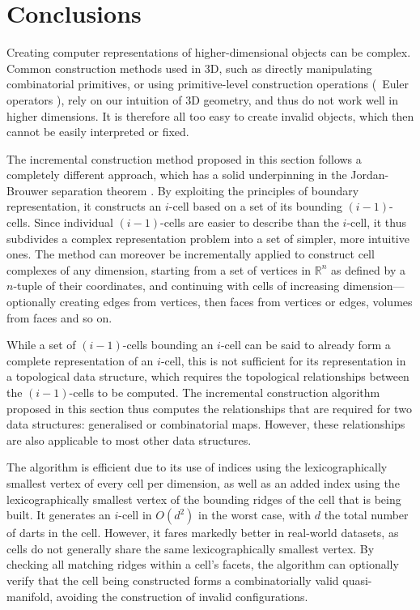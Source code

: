 \section{Conclusions}
\label{se:incremental-conclusions}

Creating computer representations of higher-dimensional objects can be complex.
Common construction methods used in 3D, such as directly manipulating combinatorial primitives, or using primitive-level construction operations (\eg\ Euler operators \citep{Mantyla88}), rely on our intuition of 3D geometry, and thus do not work well in higher dimensions.
It is therefore all too easy to create invalid objects, which then cannot be easily interpreted or fixed.

The incremental construction method proposed in this section follows a completely different approach, which has a solid underpinning in the Jordan-Brouwer separation theorem \citep{Lebesgue11,Brouwer11}.
By exploiting the principles of boundary representation, it constructs an $i$-cell based on a set of its bounding $(i-1)$-cells.
Since individual $(i-1)$-cells are easier to describe than the $i$-cell, it thus subdivides a complex representation problem into a set of simpler, more intuitive ones.
The method can moreover be incrementally applied to construct cell complexes of any dimension, starting from a set of vertices in $\mathbb{R}^n$ as defined by a $n$-tuple of their coordinates, and continuing with cells of increasing dimension---optionally creating edges from vertices, then faces from vertices or edges, volumes from faces and so on.

While a set of $(i-1)$-cells bounding an $i$-cell can be said to already form a complete representation of an $i$-cell, this is not sufficient for its representation in a topological data structure, which requires the topological relationships between the $(i-1)$-cells to be computed.
The incremental construction algorithm proposed in this section thus computes the relationships that are required for two data structures: generalised or combinatorial maps.
However, these relationships are also applicable to most other data structures.

The algorithm is efficient due to its use of indices using the lexicographically smallest vertex of every cell per dimension, as well as an added index using the lexicographically smallest vertex of the bounding ridges of the cell that is being built.
It generates an $i$-cell in $O(d^{2})$ in the worst case, with $d$ the total number of darts in the cell.
However, it fares markedly better in real-world datasets, as cells do not generally share the same lexicographically smallest vertex.
By checking all matching ridges within a cell's facets, the algorithm can optionally verify that the cell being constructed forms a combinatorially valid quasi-manifold, avoiding the construction of invalid configurations.

